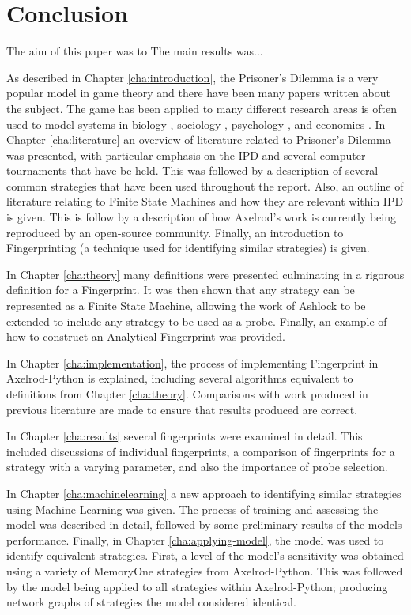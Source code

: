 
\chapter{Conclusion}\label{cha:conclusion}

The aim of this paper was to
The main results was...

As described in Chapter \ref{cha:introduction}, the Prisoner's Dilemma is a very popular model in game theory and there have been many papers written about the subject.
The game has been applied to many different research areas is often used to model systems in biology \cite{Sigmund1999}, sociology \cite{Franken2005}, psychology \cite{Ishibuchi2005}, and economics \cite{Chong2005}.
In Chapter \ref{cha:literature} an overview of literature related to Prisoner's Dilemma was presented, with particular emphasis on the IPD and several computer tournaments that have be held.
This was followed by a description of several common strategies that have been used throughout the report.
Also, an outline of literature relating to Finite State Machines and how they are relevant within IPD is given.
This is follow by a description of how Axelrod's work is currently being reproduced by an open-source community.
Finally, an introduction to Fingerprinting (a technique used for identifying similar strategies) is given.

In Chapter \ref{cha:theory} many definitions were presented culminating in a rigorous definition for a Fingerprint.
It was then shown that any strategy can be represented as a Finite State Machine, allowing the work of Ashlock to be extended to include any strategy to be used as a probe.
Finally, an example of how to construct an Analytical Fingerprint was provided.

In Chapter \ref{cha:implementation}, the process of implementing Fingerprint in Axelrod-Python is explained, including several algorithms equivalent to definitions from Chapter \ref{cha:theory}.
Comparisons with work produced in previous literature are made to ensure that results produced are correct.

In Chapter \ref{cha:results} several fingerprints were examined in detail.
This included discussions of individual fingerprints, a comparison of fingerprints for a strategy with a varying parameter, and also the importance of probe selection.

In Chapter \ref{cha:machinelearning} a new approach to identifying similar strategies using Machine Learning was given.
The process of training and assessing the model was described in detail, followed by some preliminary results of the models performance.
Finally, in Chapter \ref{cha:applying-model}, the model was used to identify equivalent strategies.
First, a level of the model's sensitivity was obtained using a variety of MemoryOne strategies from Axelrod-Python.
This was followed by the model being applied to all strategies within Axelrod-Python; producing network graphs of strategies the model considered identical.
